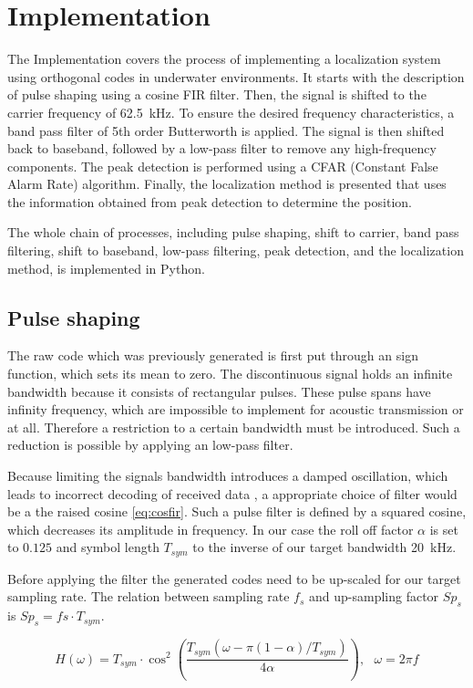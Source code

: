 
\chapter{Implementation}
The Implementation covers the process of implementing a localization system using orthogonal codes in underwater environments. It starts with the description of pulse shaping using a cosine FIR filter. Then, the signal is shifted to the carrier frequency of \SI{62.5}{\kilo\hertz}. To ensure the desired frequency characteristics, a band pass filter of 5th order Butterworth is applied. The signal is then shifted back to baseband, followed by a low-pass filter to remove any high-frequency components. The peak detection is performed using a CFAR (Constant False Alarm Rate) algorithm. Finally, the localization method is presented that uses the information obtained from peak detection to determine the position. 

The whole chain of processes, including pulse shaping, shift to carrier, band pass filtering, shift to baseband, low-pass filtering, peak detection, and the localization method, is implemented in Python.

\section{Pulse shaping}
The raw code which was previously generated is first put through an sign function, which sets its mean to zero. The discontinuous signal holds an infinite bandwidth because it consists of rectangular pulses. These pulse spans have infinity frequency, which are impossible to implement for acoustic transmission or at all. Therefore a restriction to a certain bandwidth must be introduced. Such a reduction is possible by applying an low-pass filter.

Because limiting the signals bandwidth introduces a damped oscillation, which leads to incorrect decoding of received data \cite{ken07}, a appropriate choice of filter would be a the raised cosine \ref{eq:cosfir}. Such a pulse filter is defined by a squared cosine, which decreases its amplitude in frequency. In our case the roll off factor $\alpha$ is set to $0.125$ and symbol length $T_{sym}$ to the inverse of our target bandwidth \SI{20}{\kilo\hertz}.

Before applying the filter the generated codes need to be up-scaled for our target sampling rate. The relation between sampling rate $f_s$ and up-sampling factor $Sp_s$ is $Sp_s=fs\cdot T_{sym}$.

\begin{equation}
	H(\omega)=T_{sym}\cdot \cos^2\left(\dfrac{T_{sym}(\omega-\pi(1-\alpha)/T_{sym})}{4\alpha}\right),~~~\omega=2\pi f
	\label{eq:cosfir}
\end{equation}


